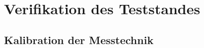 

\chapter{Verifikation des Teststandes}\label{cha:4}


\section{Kalibration der Messtechnik}\label{cha:4_Kalibration_Messtechnik}





